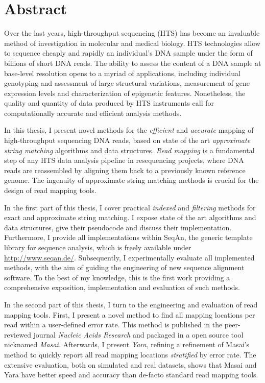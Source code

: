 \section*{Abstract}
\label{sec:abstract:en}

Over the last years, high-throughput sequencing (HTS) has become an invaluable method of investigation in molecular  and medical biology.
HTS technologies allow to sequence cheaply and rapidly an individual's DNA sample under the form of billions of short DNA reads.
The ability to assess the content of a DNA sample at base-level resolution opens to a myriad of applications, including individual genotyping and assessment of large structural variations, measurement of gene expression levels and characterization of epigenetic features.
Nonetheless, the quality and quantity of data produced by HTS instruments call for computationally accurate and efficient analysis methods.

In this thesis, I present novel methods for the \emph{efficient} and \emph{accurate} mapping of high-throughput sequencing DNA reads, based on state of the art \emph{approximate string matching} algorithms and data structures.
\emph{Read mapping} is a fundamental step of any HTS data analysis pipeline in resequencing projects, where DNA reads are reassembled by aligning them back to a previously known reference genome.
The ingenuity of approximate string matching methods is crucial for the design of read mapping tools.

In the first part of this thesis, I cover practical \emph{indexed} and \emph{filtering} methods for exact and approximate string matching.
I expose state of the art algorithms and data structures, give their pseudocode and discuss their implementation.
Furthermore, I provide all implementations within SeqAn, the generic \CC template library for sequence analysis, which is freely available under \url{http://www.seqan.de/}.
Subsequently, I experimentally evaluate all implemented methods, with the aim of guiding the engineering of new sequence alignment software.
To the best of my knowledge, this is the first work providing a comprehensive exposition, implementation and evaluation of such methods.

In the second part of this thesis, I turn to the engineering and evaluation of read mapping tools.
First, I present a novel method to find all mapping locations per read within a user-defined error rate.
This method is published in the peer-reviewed journal \emph{Nucleic Acids Research} and packaged in a open source tool nicknamed \emph{Masai}.
Afterwards, I present \emph{Yara}, refining a refinement of Masai's method to quickly report all read mapping locations \emph{stratified} by error rate.
The extensive evaluation, both on simulated and real datasets, shows that Masai and Yara have better speed and accuracy than de-facto standard read mapping tools.


\newpage
